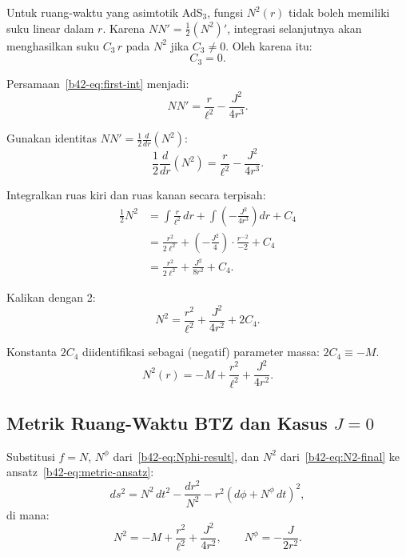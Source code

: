 Untuk ruang-waktu yang asimtotik AdS$_3$, fungsi $N^2(r)$ tidak boleh memiliki suku linear dalam $r$. Karena $NN' = \frac{1}{2}(N^2)'$, integrasi selanjutnya akan menghasilkan suku $C_3\,r$ pada $N^2$ jika $C_3 \neq 0$. Oleh karena itu:
\begin{equation}
    C_3 = 0.
\end{equation}

Persamaan~\eqref{b42-eq:first-int} menjadi:
\begin{equation}
    NN' = \frac{r}{\ell^2} - \frac{J^2}{4r^3}. \label{b42-eq:NNprime}
\end{equation}

Gunakan identitas $NN' = \frac{1}{2}\frac{d}{dr}(N^2)$:
\begin{equation}
    \frac{1}{2}\frac{d}{dr}(N^2) = \frac{r}{\ell^2} - \frac{J^2}{4r^3}.
\end{equation}

Integralkan ruas kiri dan ruas kanan secara terpisah:
\begin{align}
    \frac{1}{2}N^2 &= \int\frac{r}{\ell^2}\,dr + \int\left(-\frac{J^2}{4r^3}\right)dr + C_4 \nonumber\\[6pt]
    &= \frac{r^2}{2\ell^2} + \left(-\frac{J^2}{4}\right)\cdot\frac{r^{-2}}{-2} + C_4 \nonumber\\[6pt]
    &= \frac{r^2}{2\ell^2} + \frac{J^2}{8r^2} + C_4. \label{b42-eq:half-N2}
\end{align}

Kalikan dengan 2:
\begin{equation}
    N^2 = \frac{r^2}{\ell^2} + \frac{J^2}{4r^2} + 2C_4. \label{b42-eq:N2-with-const}
\end{equation}

Konstanta $2C_4$ diidentifikasi sebagai (negatif) parameter massa: $2C_4 \equiv -M$.
\begin{equation}
    N^2(r) = -M + \frac{r^2}{\ell^2} + \frac{J^2}{4r^2}. \label{b42-eq:N2-final}
\end{equation}

\subsection{Metrik Ruang-Waktu BTZ dan Kasus $J=0$}
\label{b42-sec:metric}

Substitusi $f = N$, $N^\phi$ dari~\eqref{b42-eq:Nphi-result}, dan $N^2$ dari~\eqref{b42-eq:N2-final} ke ansatz~\eqref{b42-eq:metric-ansatz}:
\begin{equation}
    ds^2 = N^2\,dt^2 - \frac{dr^2}{N^2} - r^2\!\left(d\phi + N^\phi\,dt\right)^2, \label{b42-eq:metric-before}
\end{equation}
di mana:
\begin{equation}
    N^2 = -M + \frac{r^2}{\ell^2} + \frac{J^2}{4r^2}, \qquad N^\phi = -\frac{J}{2r^2}.
\end{equation}

